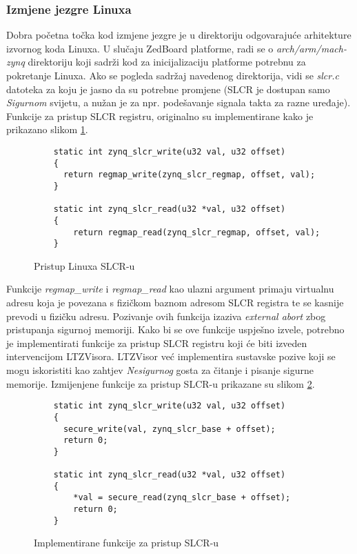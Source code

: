 \documentclass[times, utf8, diplomski, numeric]{fer}
\begin{document}
\subsubsection{Izmjene jezgre Linuxa}
Dobra početna točka kod izmjene jezgre je u direktoriju odgovarajuće arhitekture izvornog koda Linuxa. U slučaju ZedBoard
platforme, radi se o \textit{arch/arm/mach-zynq} direktoriju koji sadrži kod za inicijalizaciju platforme potrebnu za
pokretanje Linuxa. Ako se pogleda sadržaj navedenog direktorija, vidi se \textit{slcr.c} datoteka za koju je jasno da su
potrebne promjene (SLCR je dostupan samo \textit{Sigurnom} svijetu, a nužan je za npr. podešavanje signala takta za razne uređaje).
Funkcije za pristup SLCR registru, originalno su implementirane kako je prikazano slikom \ref{slcr_orig}.
\begin{figure}[H]
  \begin{lstlisting}
    static int zynq_slcr_write(u32 val, u32 offset)
    {
      return regmap_write(zynq_slcr_regmap, offset, val);
    }

    static int zynq_slcr_read(u32 *val, u32 offset)
    {
    	return regmap_read(zynq_slcr_regmap, offset, val);
    }
  \end{lstlisting}
  \caption{Pristup Linuxa SLCR-u}
  \label{slcr_orig}
\end{figure}
Funkcije \textit{regmap\_write} i \textit{regmap\_read} kao ulazni argument primaju virtualnu adresu koja je povezana s fizičkom
baznom adresom SLCR registra te se kasnije prevodi u fizičku adresu. Pozivanje ovih funkcija izaziva \textit{external abort}
zbog pristupanja sigurnoj memoriji. Kako bi se ove funkcije uspješno izvele, potrebno je implementirati funkcije za pristup
SLCR registru koji će biti izveden intervencijom LTZVisora. LTZVisor već implementira sustavske pozive koji se mogu iskoristiti
kao zahtjev \textit{Nesigurnog} gosta za čitanje i pisanje sigurne memorije. Izmijenjene funkcije za pristup SLCR-u prikazane su slikom
\ref{slcr_secure}.
\begin{figure}[H]
  \lstset{breaklines=true}
  \begin{lstlisting}
    static int zynq_slcr_write(u32 val, u32 offset)
    {
      secure_write(val, zynq_slcr_base + offset);
      return 0;
    }

    static int zynq_slcr_read(u32 *val, u32 offset)
    {
    	*val = secure_read(zynq_slcr_base + offset);
    	return 0;
    }
  \end{lstlisting}
  \caption{Implementirane funkcije za pristup SLCR-u}
  \label{slcr_secure}
\end{figure}
\end{document}
